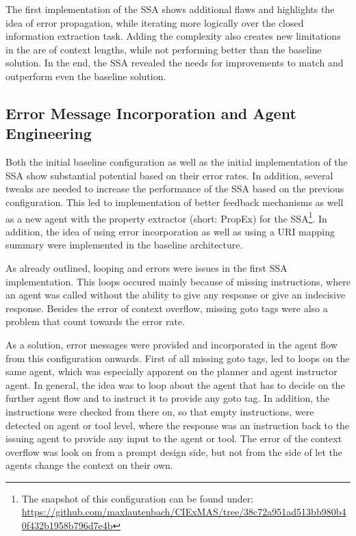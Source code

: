 \documentclass[a4paper,oneside,bibliography=totoc]{scrbook}
\begin{document}
The first implementation of the \ac{SSA} shows additional flaws and highlights the idea of error propagation, while iterating more logically over the closed information extraction task. Adding the complexity also creates new limitations in the are of context lengths, while not performing better than the baseline solution. In the end, the \ac{SSA} revealed the needs for improvements to match and outperform even the baseline solution.

\subsection{Error Message Incorporation and Agent Engineering}
\label{subsec:error_message_incorporation}

Both the initial baseline configuration as well as the initial implementation of the \ac{SSA} show substantial potential based on their error rates. In addition, several tweaks are needed to increase the performance of the \ac{SSA} based on the previous configuration. This led to implementation of better feedback mechanisms as well as a new agent with the property extractor (short: PropEx) for the \ac{SSA}\footnote{The snapshot of this configuration can be found under: \url{https://github.com/maxlautenbach/CIExMAS/tree/38c72a951ad513bb980b40f432b1958b796d7e4b}}. In addition, the idea of using error incorporation as well as using a URI mapping summary were implemented in the baseline architecture.

As already outlined, looping and errors were issues in the first \ac{SSA} implementation. This loops occured mainly because of missing instructions, where an agent was called without the ability to give any response or give an indecisive response. Besides the error of context overflow, missing goto tags were also a problem that count towards the error rate.

As a solution, error messages were provided and incorporated in the agent flow from this configuration onwards. First of all missing goto tags, led to loops on the same agent, which was especially apparent on the planner and agent instructor agent. In general, the idea was to loop about the agent that has to decide on the further agent flow and to instruct it to provide any goto tag. In addition, the instructions were checked from there on, so that empty instructions, were detected on agent or tool level, where the response was an instruction back to the issuing agent to provide any input to the agent or tool. The error of the context overflow was look on from a prompt design side, but not from the side of let the agents change the context on their own.
\end{document}

